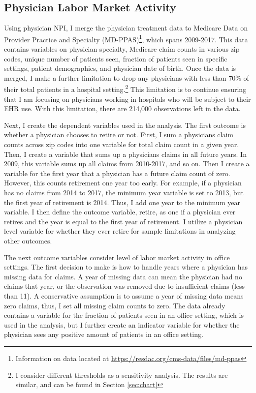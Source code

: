\documentclass[12pt]{article}
\begin{document}
\subsection{Physician Labor Market Activity}\label{sec:appmdppas}

Using physician NPI, I merge the physician treatment data to Medicare Data on Provider Practice and Specialty (MD-PPAS)\footnote{Information on data located at \hyperlink{https://resdac.org/cms-data/files/md-ppas}{https://resdac.org/cms-data/files/md-ppas}}, which spans 2009-2017. This data contains variables on physician specialty, Medicare claim counts in various zip codes, unique number of patients seen, fraction of patients seen in specific settings, patient demographics, and physician date of birth. Once the data is merged, I make a further limitation to drop any physicians with less than 70\% of their total patients in a hospital setting.\footnote{I consider different thresholds as a sensitivity analysis. The results are similar, and can be found in Section \ref{sec:chart}} This limitation is to continue ensuring that I am focusing on physicians working in hospitals who will be subject to their EHR use. With this limitation, there are 214,000 observations left in the data. 

Next, I create the dependent variables used in the analysis. The first outcome is whether a physician chooses to retire or not. First, I sum a physicians claim counts across zip codes into one variable for total claim count in a given year. Then, I create a variable that sums up a physicians claims in all future years. In 2009, this variable sums up all claims from 2010-2017, and so on. Then I create a variable for the first year that a physician has a future claim count of zero. However, this counts retirement one year too early. For example, if a physician has no claims from 2014 to 2017, the minimum year variable is set to 2013, but the first year of retirement is 2014. Thus, I add one year to the minimum year variable. I then define the outcome variable, retire, as one if a physician ever retires and the year is equal to the first year of retirement. I utilize a physician level variable for whether they ever retire for sample limitations in analyzing other outcomes. 

The next outcome variables consider level of labor market activity in office settings. The first decision to make is how to handle years where a physician has missing data for claims. A year of missing data can mean the physician had no claims that year, or the observation was removed due to insufficient claims (less than 11). A conservative assumption is to assume a year of missing data means zero claims, thus, I set all missing claim counts to zero. The data already contains a variable for the fraction of patients seen in an office setting, which is used in the analysis, but I further create an indicator variable for whether the physician sees any positive amount of patients in an office setting. 
\end{document}
